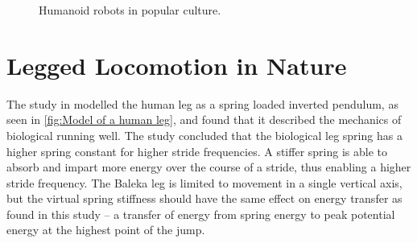 \begin{figure}
\centering
{}

\caption{Humanoid robots in popular culture.}
\end{figure}

\section{Legged Locomotion in Nature}
\label{sec:Legged Locomotion in Nature}

The study in \cite{Farley1996} modelled the human leg as a spring loaded inverted pendulum, as seen in \cref{fig:Model of a human leg}, and found that it described the mechanics of biological running well. The study concluded that the biological leg spring has a higher spring constant for higher stride frequencies.\cite{Farley1996} A stiffer spring is able to absorb and impart more energy over the course of a stride, thus enabling a higher stride frequency. The Baleka leg is limited to movement in a single vertical axis, but the virtual spring stiffness should have the same effect on energy transfer as found in this study -- a transfer of energy from spring energy to peak potential energy at the highest point of the jump.

